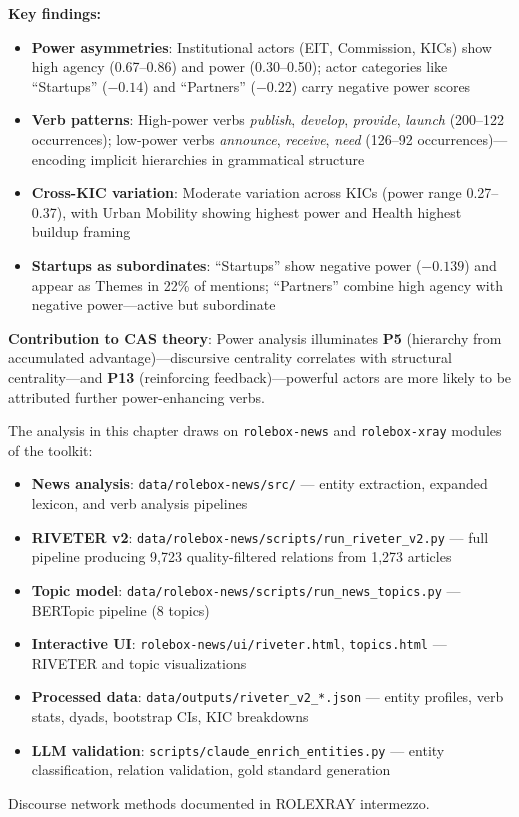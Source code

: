 \documentclass[../main.tex]{subfiles}
\begin{document}
\begin{summarybox}
\textbf{Key findings:}
\begin{itemize}[leftmargin=*, itemsep=0.1em]
\item \textbf{Power asymmetries}: Institutional actors (EIT, Commission, KICs) show high agency (0.67--0.86) and power (0.30--0.50); actor categories like ``Startups'' ($-0.14$) and ``Partners'' ($-0.22$) carry negative power scores
\item \textbf{Verb patterns}: High-power verbs \textit{publish}, \textit{develop}, \textit{provide}, \textit{launch} (200--122 occurrences); low-power verbs \textit{announce}, \textit{receive}, \textit{need} (126--92 occurrences)---encoding implicit hierarchies in grammatical structure
\item \textbf{Cross-KIC variation}: Moderate variation across KICs (power range 0.27--0.37), with Urban Mobility showing highest power and Health highest buildup framing
\item \textbf{Startups as subordinates}: ``Startups'' show negative power ($-0.139$) and appear as Themes in 22\% of mentions; ``Partners'' combine high agency with negative power---active but subordinate
\end{itemize}

\textbf{Contribution to CAS theory}: Power analysis illuminates \textbf{P5} (hierarchy from accumulated advantage)---discursive centrality correlates with structural centrality---and \textbf{P13} (reinforcing feedback)---powerful actors are more likely to be attributed further power-enhancing verbs.
\end{summarybox}

\vspace{0.5em}
\begin{replicationbox}
The analysis in this chapter draws on \texttt{rolebox-news} and \texttt{rolebox-xray} modules of the \RoleBox{} toolkit:
\begin{itemize}[leftmargin=*, itemsep=0.2em]
\item \textbf{News analysis}: \texttt{data/rolebox-news/src/} --- entity extraction, expanded lexicon, and verb analysis pipelines
\item \textbf{RIVETER v2}: \texttt{data/rolebox-news/scripts/run\_riveter\_v2.py} --- full pipeline producing 9,723 quality-filtered relations from 1,273 articles
\item \textbf{Topic model}: \texttt{data/rolebox-news/scripts/run\_news\_topics.py} --- BERTopic pipeline (8 topics)
\item \textbf{Interactive UI}: \texttt{rolebox-news/ui/riveter.html}, \texttt{topics.html} --- RIVETER and topic visualizations
\item \textbf{Processed data}: \texttt{data/outputs/riveter\_v2\_*.json} --- entity profiles, verb stats, dyads, bootstrap CIs, KIC breakdowns
\item \textbf{LLM validation}: \texttt{scripts/claude\_enrich\_entities.py} --- entity classification, relation validation, gold standard generation
\end{itemize}
Discourse network methods documented in ROLEXRAY intermezzo.
\end{replicationbox}
\end{document}
